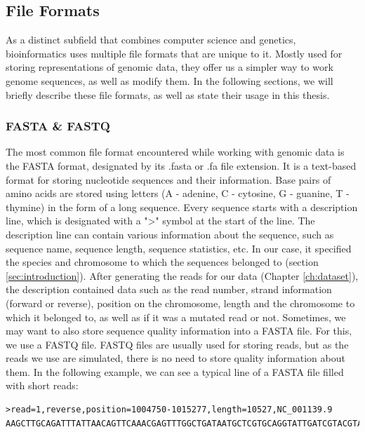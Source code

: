 \documentclass[times, utf8, diplomski, english]{fer_eng}
\begin{document}
\subsection{File Formats}
\label{subsec:file formats}

As a distinct subfield that combines computer science and genetics, bioinformatics uses multiple file formats that are unique to it. Mostly used for storing representations of genomic data, they offer us a simpler way to work genome sequences, as well as modify them. In the following sections, we will briefly describe these file formats, as well as state their usage in this thesis.

\subsubsection{FASTA \& FASTQ}
\label{subsubsec:fasta and fastq}

The most common file format encountered while working with genomic data is the FASTA format, designated by its .fasta or .fa file extension. It is a text-based format for storing nucleotide sequences and their information. Base pairs of amino acids are stored using letters (A - adenine, C - cytosine, G - guanine, T - thymine) in the form of a long sequence. Every sequence starts with a description line, which is designated with a ">" symbol at the start of the line. The description line can contain various information about the sequence, such as sequence name, sequence length, sequence statistics, etc. In our case, it specified the species and chromosome to which the sequences belonged to (section \ref{sec:introduction}). After generating the reads for our data (Chapter \ref{ch:dataset}), the description contained data such as the read number, strand information (forward or reverse), position on the chromosome, length and the chromosome to which it belonged to, as well as if it was a mutated read or not. Sometimes, we may want to also store sequence quality information into a FASTA file. For this, we use a FASTQ file. FASTQ files are usually used for storing reads, but as the reads we use are simulated, there is no need to store quality information about them. In the following example, we can see a typical line of a FASTA file filled with short reads:
\begin{lstlisting}
>read=1,reverse,position=1004750-1015277,length=10527,NC_001139.9
AAGCTTGCAGATTTATTAACAGTTCAAACGAGTTTGGCTGATAATGCTCGTGCAGGTATTGATCGTACGTACGTAGCTACGTG
\end{lstlisting}
\end{document}
